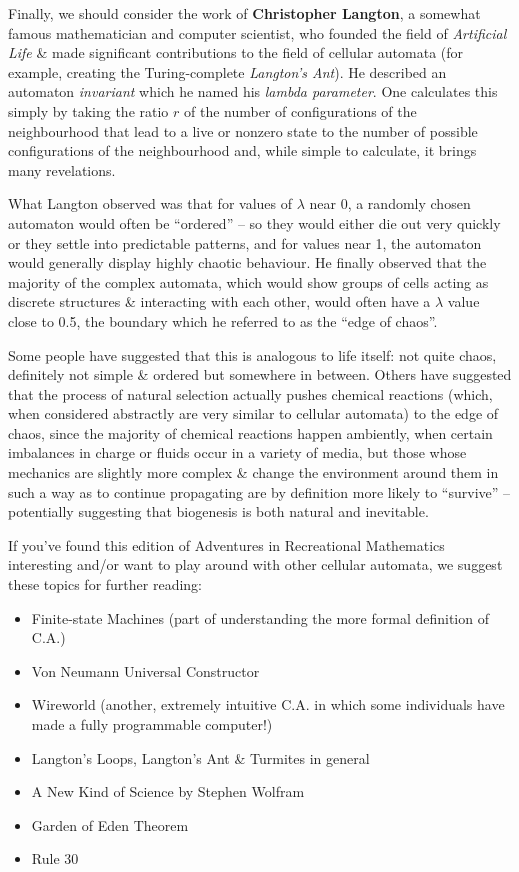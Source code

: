 Finally, we should consider the work of \textbf{Christopher Langton}, a
somewhat famous mathematician and computer scientist, who founded the
field of \emph{Artificial Life} \& made significant contributions to the
field of cellular automata (for example, creating the Turing-complete
\emph{Langton's Ant}). He described an automaton \emph{invariant} which
he named his \emph{lambda parameter}. One calculates this simply by
taking the ratio \(r\) of the number of configurations of the
neighbourhood that lead to a live or nonzero state to the number of
possible configurations of the neighbourhood and, while simple to
calculate, it brings many revelations.

What Langton observed was that for values of \(λ\) near 0, a randomly
chosen automaton would often be ``ordered'' -- so they would either die
out very quickly or they settle into predictable patterns, and for
values near 1, the automaton would generally display highly chaotic
behaviour. He finally observed that the majority of the complex
automata, which would show groups of cells acting as discrete structures
\& interacting with each other, would often have a \(λ\) value close to
0.5, the boundary which he referred to as the ``edge of chaos''.

Some people have suggested that this is analogous to life itself: not
quite chaos, definitely not simple \& ordered but somewhere in between.
Others have suggested that the process of natural selection actually
pushes chemical reactions (which, when considered abstractly are very
similar to cellular automata) to the edge of chaos, since the majority
of chemical reactions happen ambiently, when certain imbalances in
charge or fluids occur in a variety of media, but those whose mechanics
are slightly more complex \& change the environment around them in such
a way as to continue propagating are by definition more likely to
``survive'' -- potentially suggesting that biogenesis is both natural
and inevitable.

If you've found this edition of Adventures in Recreational Mathematics
interesting and/or want to play around with other cellular automata, we
suggest these topics for further reading:

\begin{itemize}
\item
  Finite-state Machines (part of understanding the more formal
  definition of C.A.)
\item
  Von Neumann Universal Constructor
\item
  Wireworld (another, extremely intuitive C.A. in which some individuals
  have made a fully programmable computer!)
\item
  Langton's Loops, Langton's Ant \& Turmites in general
\item
  A New Kind of Science by Stephen Wolfram
\item
  Garden of Eden Theorem
\item
  Rule 30
\end{itemize}

